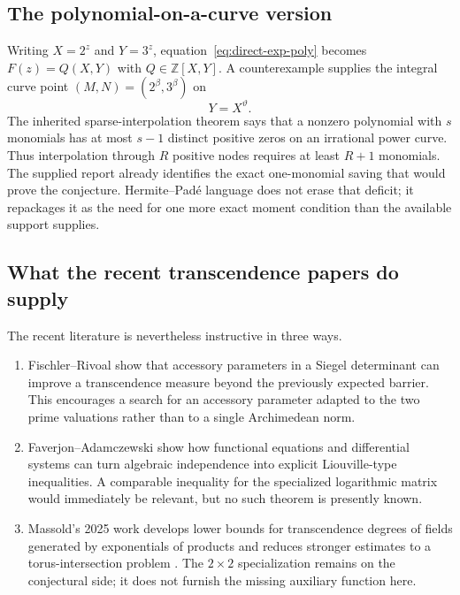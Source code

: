 \documentclass[11pt,oneside]{article}
\theoremstyle{definition}
\theoremstyle{remark}
\newcommand{\Z}{\mathbb Z}
\newcommand{\thetaq}{\vartheta}
\begin{document}
\subsection{The polynomial-on-a-curve version}

Writing $X=2^z$ and $Y=3^z$, equation~\eqref{eq:direct-exp-poly} becomes
$F(z)=Q(X,Y)$ with $Q\in\Z[X,Y]$.  A counterexample supplies the integral curve point
$(M,N)=(2^\beta,3^\beta)$ on
\[
 Y=X^{\thetaq}.
\]
The inherited sparse-interpolation theorem says that a nonzero polynomial with $s$ monomials
has at most $s-1$ distinct positive zeros on an irrational power curve.  Thus interpolation
through $R$ positive nodes requires at least $R+1$ monomials.  The supplied report already
identifies the exact one-monomial saving that would prove the conjecture.  Hermite--Pad\'e
language does not erase that deficit; it repackages it as the need for one more exact moment
condition than the available support supplies.

\subsection{What the recent transcendence papers do supply}

The recent literature is nevertheless instructive in three ways.

\begin{enumerate}
\item Fischler--Rivoal show that accessory parameters in a Siegel determinant can improve a
      transcendence measure beyond the previously expected barrier.  This encourages a
      search for an accessory parameter adapted to the two prime valuations rather than to a
      single Archimedean norm.
\item Faverjon--Adamczewski show how functional equations and differential systems can turn
      algebraic independence into explicit Liouville-type inequalities.  A comparable
      inequality for the specialized logarithmic matrix would immediately be relevant, but
      no such theorem is presently known.
\item Massold's 2025 work develops lower bounds for transcendence degrees of fields generated
      by exponentials of products and reduces stronger estimates to a torus-intersection
      problem \cite{Massold2025}.  The $2\times2$ specialization remains on the conjectural
      side; it does not furnish the missing auxiliary function here.
\end{enumerate}
\end{document}
